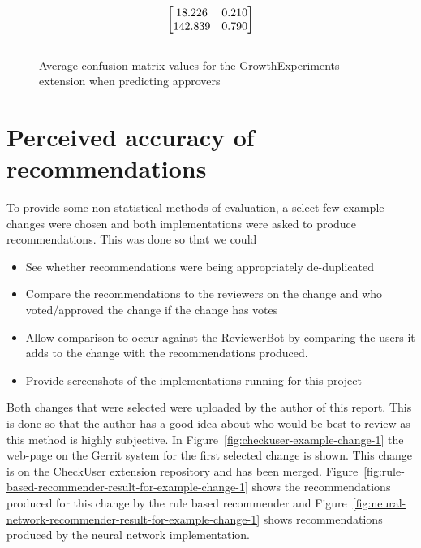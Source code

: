 \begin{figure}[H]
\begin{equation}
\begin{bmatrix}
$18.226$ & $0.210$ \\
$142.839$ & $0.790$
\end{bmatrix}
\label{matrix:confusion-matrix-approved-growth}
\end{equation}
\\{Average confusion matrix values for the GrowthExperiments extension when predicting approvers}
\end{figure}
\hspace{0.25cm}

\section{Perceived accuracy of recommendations\label{section:perceived-accuracy-of-recommendations}}
To provide some non-statistical methods of evaluation, a select few example changes were chosen and both implementations were asked to produce recommendations. This was done so that we could
\begin{itemize}
    \item See whether recommendations were being appropriately de-duplicated
    \item Compare the recommendations to the reviewers on the change and who voted/approved the change if the change has votes
    \item Allow comparison to occur against the ReviewerBot by comparing the users it adds to the change with the recommendations produced.
    \item Provide screenshots of the implementations running for this project
\end{itemize}

Both changes that were selected were uploaded by the author of this report. This is done so that the author has a good idea about who would be best to review as this method is highly subjective. In Figure~\ref{fig:checkuser-example-change-1} the web-page on the Gerrit system for the first selected change is shown. This change is on the CheckUser extension repository and has been merged. Figure~\ref{fig:rule-based-recommender-result-for-example-change-1} shows the recommendations produced for this change by the rule based recommender and Figure~\ref{fig:neural-network-recommender-result-for-example-change-1} shows recommendations produced by the neural network implementation.

